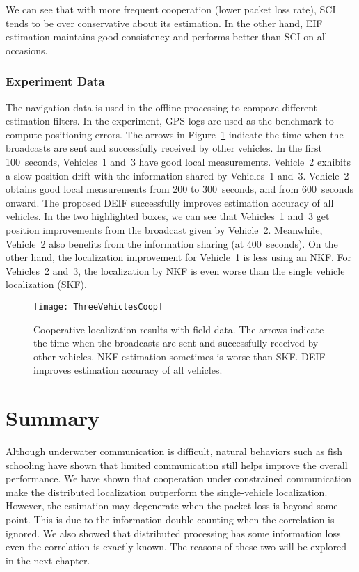 We can see that with more frequent cooperation (lower packet loss rate), SCI tends to be over conservative about its estimation. In the other hand, EIF estimation maintains good consistency and performs better than SCI on all occasions.

\subsubsection{Experiment Data}

The navigation data is used in the offline processing to compare different estimation filters. In the experiment, GPS logs are used as the benchmark to compute positioning errors. The arrows in Figure~\ref{fig:ThreeVehiclesCoop} indicate the time when the broadcasts are sent and successfully received by other vehicles. In the first 100~seconds, Vehicles~1 and~3 have good local measurements. Vehicle~2 exhibits a slow position drift with the information shared by Vehicles~1 and~3. Vehicle~2 obtains good local measurements from 200 to 300~seconds, and from 600~seconds onward. The proposed DEIF successfully improves estimation accuracy of all vehicles. In the two highlighted boxes, we can see that Vehicles~1 and~3 get position improvements from the broadcast given by Vehicle~2. Meanwhile, Vehicle~2 also benefits from the information sharing (at 400~seconds). On the other hand, the localization improvement for Vehicle~1 is less using an NKF. For Vehicles~2 and~3, the localization by NKF is even worse than the single vehicle localization (SKF). 

\begin{figure}[htbp]
\centering
\texttt{[image: ThreeVehiclesCoop]}
\caption{Cooperative localization results with field data. The arrows indicate the time when the broadcasts are sent and successfully received by other vehicles. NKF estimation sometimes is worse than SKF. DEIF improves estimation accuracy of all vehicles.}
\label{fig:ThreeVehiclesCoop}
\end{figure}

\section{Summary}

Although underwater communication is difficult, natural behaviors such as fish schooling have shown that limited communication still helps improve the overall performance. We have shown that cooperation under constrained communication make the distributed localization outperform the single-vehicle localization. However, the estimation may degenerate when the packet loss is beyond some point. This is due to the information double counting when the correlation is ignored. We also showed that distributed processing has some information loss even the correlation is exactly known. The reasons of these two will be explored in the next chapter.

